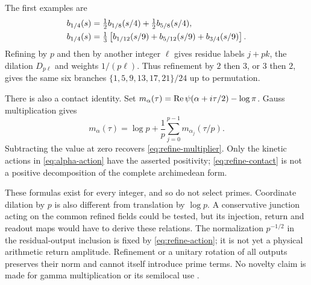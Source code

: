 The first examples are
\begin{align}
 b_{1/4}(s)&=\tfrac12b_{1/8}(s/4)+\tfrac12b_{5/8}(s/4),
 \notag\\
 b_{1/4}(s)&=\tfrac13\left[b_{1/12}(s/9)+b_{5/12}(s/9)
                           +b_{3/4}(s/9)\right].
 \label{eq:refine-examples}
\end{align}
Refining by $p$ and then by another integer $\ell$ gives residue
labels $j+pk$, the dilation $D_{p\ell}$ and weights $1/(p\ell)$.
Thus refinement by $2$ then $3$, or $3$ then $2$, gives the same six
branches $\{1,5,9,13,17,21\}/24$ up to permutation.

There is also a contact identity. Set
$m_\alpha(\tau)=\operatorname{Re}\psi(\alpha+i\tau/2)-\log\pi$. Gauss
multiplication \cite{DLMF} gives
\begin{equation}\label{eq:refine-contact}
 m_\alpha(\tau)=\log p+
       \frac1p\sum_{j=0}^{p-1}m_{\alpha_j}(\tau/p).
\end{equation}
Subtracting the value at zero recovers \eqref{eq:refine-multiplier}.
Only the kinetic actions in \eqref{eq:alpha-action} have the asserted
positivity; \eqref{eq:refine-contact} is not a positive decomposition
of the complete archimedean form.

These formulas exist for every integer, and so do not select primes.
Coordinate dilation by $p$ is also different from translation by
$\log p$. A conservative junction acting on the common refined fields
could be tested, but its injection, return and readout maps would have
to derive these relations. The normalization $p^{-1/2}$ in the
residual-output inclusion is fixed by \eqref{eq:refine-action}; it is
not yet a physical arithmetic return amplitude. Refinement or a unitary
rotation of all outputs preserves their norm and cannot itself introduce
prime terms. No novelty claim is made for gamma multiplication or its
semilocal use \cite{QuasiInner}.
